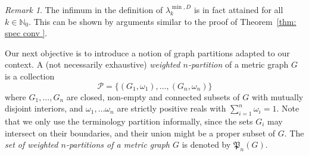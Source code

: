 \documentclass[reqno]{amsart}
\theoremstyle{plain}
\theoremstyle{definition}
\theoremstyle{remark}
\newtheorem{rmk}[thm]{Remark}
\numberwithin{equation}{section}
\newcommand{\N}{\mathbb{N}}     %
\begin{document}
\begin{rmk}
The infimum in the definition of $\lambda_k^{\min,D}$ is in fact attained for all $k \in \N_0$. This can be shown by arguments similar to the proof of Theorem~\ref{thm: spec conv }.
\end{rmk}

Our next objective is to introduce a notion of graph partitions adapted to our context. A (not necessarily exhaustive) \emph{weighted $n$-partition} of a metric graph $G$ is a collection
\[
\mathcal{P}= \big \{ (G_1,\omega_1), \dots, (G_n, \omega_n) \big \}
\]
where $G_1, \dots, G_n$ are closed, non-empty and connected subsets of $G$ with mutually disjoint interiors, and $\omega_1, \dots \omega_n$ are strictly positive reals with $\sum_{i=1}^n \omega_i=1$.
Note that we only use the terminology partition informally, since the sets $G_i$ may intersect on their boundaries, and their union might be a proper subset of $G$.
The \emph{set of weighted $n$-partitions of a metric graph $G$} is denoted by $\mathfrak{P}_n(G)$.
\end{document}
